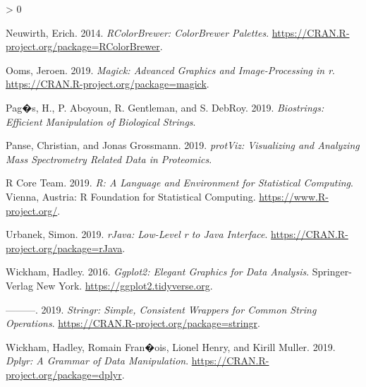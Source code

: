 \documentclass[
]{article}
\newlength{\cslhangindent}
\newenvironment{CSLReferences}[2] %
 {%
  \setlength{\parindent}{0pt}
  \ifodd #1 \everypar{\setlength{\hangindent}{\cslhangindent}}\ignorespaces\fi
  \ifnum #2 > 0
  \setlength{\parskip}{#2\baselineskip}
  \fi
 }%
 {}
\begin{document}
\begin{CSLReferences}{1}{0}
\leavevmode\hypertarget{ref-RColorBrewer}{}%
Neuwirth, Erich. 2014. \emph{RColorBrewer: ColorBrewer Palettes}.
\url{https://CRAN.R-project.org/package=RColorBrewer}.

\leavevmode\hypertarget{ref-magick}{}%
Ooms, Jeroen. 2019. \emph{Magick: Advanced Graphics and Image-Processing
in r}. \url{https://CRAN.R-project.org/package=magick}.

\leavevmode\hypertarget{ref-Biostrings}{}%
Pag�s, H., P. Aboyoun, R. Gentleman, and S. DebRoy. 2019.
\emph{Biostrings: Efficient Manipulation of Biological Strings}.

\leavevmode\hypertarget{ref-protViz}{}%
Panse, Christian, and Jonas Grossmann. 2019. \emph{protViz: Visualizing
and Analyzing Mass Spectrometry Related Data in Proteomics}.

\leavevmode\hypertarget{ref-tcltk}{}%
R Core Team. 2019. \emph{R: A Language and Environment for Statistical
Computing}. Vienna, Austria: R Foundation for Statistical Computing.
\url{https://www.R-project.org/}.

\leavevmode\hypertarget{ref-rJava}{}%
Urbanek, Simon. 2019. \emph{rJava: Low-Level r to Java Interface}.
\url{https://CRAN.R-project.org/package=rJava}.

\leavevmode\hypertarget{ref-ggplot2}{}%
Wickham, Hadley. 2016. \emph{Ggplot2: Elegant Graphics for Data
Analysis}. Springer-Verlag New York.
\url{https://ggplot2.tidyverse.org}.

\leavevmode\hypertarget{ref-stringr}{}%
---------. 2019. \emph{Stringr: Simple, Consistent Wrappers for Common
String Operations}. \url{https://CRAN.R-project.org/package=stringr}.

\leavevmode\hypertarget{ref-dplyr}{}%
Wickham, Hadley, Romain Fran�ois, Lionel Henry, and Kirill Muller. 2019.
\emph{Dplyr: A Grammar of Data Manipulation}.
\url{https://CRAN.R-project.org/package=dplyr}.

\end{CSLReferences}
\end{document}
